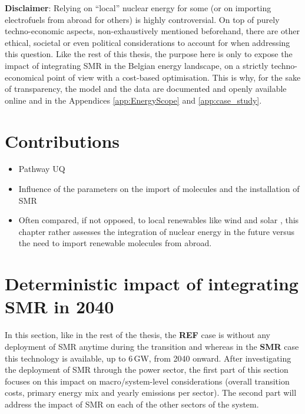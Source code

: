 \textbf{Disclaimer}: Relying on ``local'' nuclear energy for some (or on importing electrofuels from abroad for others) is highly controversial. On top of purely techno-economic aspects, non-exhaustively mentioned beforehand, there are other ethical, societal or even political considerations to account for when addressing this question. Like the rest of this thesis, the purpose here is only to expose the impact of integrating \gls{SMR} in the Belgian energy landscape, on a strictly techno-economical point of view with a cost-based optimisation. This is why, for the sake of transparency, the model and the data are documented and openly available online \cite{readthedocs_pathway} and in the Appendices \ref{app:EnergyScope} and \ref{app:case_study}.

\section*{Contributions}
\label{sec:atom_mol:contributions}
\begin{itemize}
\item Pathway UQ
\item Influence of the parameters on the import of molecules and the installation of SMR

\item Often compared, if not opposed, to local renewables like wind and solar \cite{suna2016nuclear,khatib2016economics}, this chapter rather assesses the integration of nuclear energy in the future versus the need to import renewable molecules from abroad. 

\end{itemize}

\section{Deterministic impact of integrating \gls{SMR} in 2040}
\label{sec:atom_mol:results_deter} 
In this section, like in the rest of the thesis, the \textbf{REF} case is without any deployment of \gls{SMR} anytime during the transition and whereas in the \textbf{SMR} case this technology is available, up to 6\,GW, from 2040 onward. After investigating the deployment of \gls{SMR} through the power sector, the first part of this section focuses on this impact on macro/system-level considerations (\ie overall transition costs, primary energy mix and yearly emissions per sector). The second part will address the impact of \gls{SMR} on each of the other sectors of the system.

